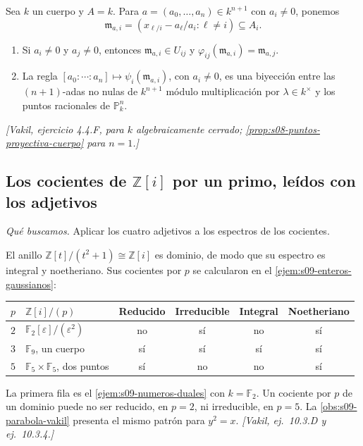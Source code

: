 \begin{afirm}
\label{afirm:s09-coordenadas-homogeneas}
Sea $k$ un cuerpo y $A=k$. Para $a=(a_0,\ldots,a_n)\in k^{n+1}$ con $a_i\ne0$, ponemos
\[
\mathfrak m_{a,i}=(x_{\ell/i}-a_\ell/a_i:\ell\ne i)\subseteq A_i.
\]
\begin{enumerate}[label=(\alph*)]
\item Si $a_i\ne0$ y $a_j\ne0$, entonces $\mathfrak m_{a,i}\in U_{ij}$ y $\varphi_{ij}(\mathfrak m_{a,i})=\mathfrak m_{a,j}$.
\item La regla $[a_0:\cdots:a_n]\mapsto\psi_i(\mathfrak m_{a,i})$, con $a_i\ne0$, es una biyección entre las $(n+1)$-adas no nulas de $k^{n+1}$ módulo multiplicación por $\lambda\in k^\times$ y los puntos racionales de $\mathbb P^n_k$.
\end{enumerate}
\emph{[Vakil, ejercicio 4.4.F, para $k$ algebraicamente cerrado; \cref{prop:s08-puntos-proyectiva-cuerpo} para $n=1$.]}
\end{afirm}

\subsection{Los cocientes de \texorpdfstring{$\mathbb Z[i]$}{Z[i]} por un primo, leídos con los adjetivos}
\emph{Qué buscamos.} Aplicar los cuatro adjetivos a los espectros de los cocientes.

\begin{ejem}
\label{ejem:s09-adjetivos-fibras}
El anillo $\mathbb Z[t]/(t^2+1)\cong\mathbb Z[i]$ es dominio, de modo que su espectro es integral y noetheriano. Sus cocientes por $p$ se calcularon en el \cref{ejem:s09-enteros-gaussianos}:
\begin{center}
\small
\renewcommand{\arraystretch}{1.25}
\setlength{\tabcolsep}{4pt}
\begin{tabular}{clcccc}
\hline
$p$ & $\mathbb Z[i]/(p)$ & Reducido & Irreducible & Integral & Noetheriano\\
\hline
$2$ & $\mathbb F_2[\varepsilon]/(\varepsilon^2)$ & no & sí & no & sí\\
$3$ & $\mathbb F_9$, un cuerpo & sí & sí & sí & sí\\
$5$ & $\mathbb F_5\times\mathbb F_5$, dos puntos & sí & no & no & sí\\
\hline
\end{tabular}
\end{center}
La primera fila es el \cref{ejem:s09-numeros-duales} con $k=\mathbb F_2$. Un cociente por $p$ de un dominio puede no ser reducido, en $p=2$, ni irreducible, en $p=5$. La \cref{obs:s09-parabola-vakil} presenta el mismo patrón para $y^2=x$. \emph{[Vakil, ej.~10.3.D y ej.~10.3.4.]}
\end{ejem}

